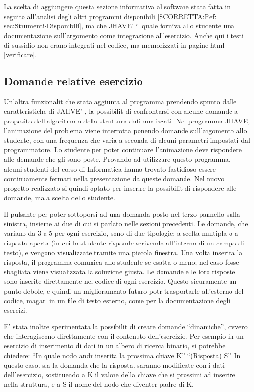 La scelta di aggiungere questa sezione informativa al software  stata
fatta in seguito all'analisi degli altri programmi disponibili \ref{SCORRETTA:Ref: sec:Strumenti-Disponibili},
ma che JHAVE' \cite{JHAVE} il quale forniva allo studente una documentazione
sull'argomento come integrazione all'esercizio. Anche qui i testi
di sussidio non erano integrati nel codice, ma memorizzati in pagine
html {[}verificare{]}.


\subsection{\label{sub:Domande-relative-esercizio}Domande relative esercizio}

Un'altra funzionalit che  stata aggiunta al programma prendendo
spunto dalle caratteristiche di JAHVE' \cite{JHAVE},  la possibilit
di confrontarsi con alcune domande a proposito dell'algoritmo o della
struttura dati analizzati. Nel programma JHAVE, l'animazione del problema
viene interrotta ponendo domande sull'argomento allo studente, con
una frequenza che varia a seconda di alcuni parametri impostati dal
programmatore. Lo studente per poter continuare l'animazione deve
rispondere alle domande che gli sono poste. Provando ad utilizzare
questo programma, alcuni studenti del corso di Informatica hanno trovato
fastidioso essere continuamente fermati nella presentazione da queste
domande. Nel nuovo progetto realizzato si  quindi optato per inserire
la possibilit di rispondere alle domande, ma a scelta dello studente.

Il pulsante per poter sottoporsi ad una domanda  posto nel terzo
pannello sulla sinistra, insieme ai due di cui si  parlato nelle
sezioni precedenti. Le domande, che variano da 3 a 5 per ogni esercizio,
sono di due tipologie: a scelta multipla o a risposta aperta (in cui
lo studente risponde scrivendo all'interno di un campo di testo),
e vengono visualizzate tramite una piccola finestra. Una volta inserita
la risposta, il programma comunica allo studente se  esatta o meno;
nel caso fosse sbagliata viene visualizzata la soluzione giusta. Le
domande e le loro risposte sono inserite direttamente nel codice di
ogni esercizio. Questo  sicuramente un punto debole, e quindi un
miglioramento futuro potr trasportarle all'esterno del codice, magari
in un file di testo esterno, come per la documentazione degli esercizi.

E' stata inoltre sperimentata la possibilit di creare domande {}``dinamiche'',
ovvero che interagiscono direttamente con il contenuto dell'esercizio.
Per esempio in un esercizio di inserimento di dati in un albero di
ricerca binario, si potrebbe chiedere: {}``In quale nodo andr inserita
la prossima chiave K'' {}``(Risposta) S''. In questo caso, sia
la domanda che la risposta, saranno modificate con i dati dell'esercizio,
sostituendo a K il valore della chiave che si  prossimi ad inserire
nella struttura, e a S il nome del nodo che diventer padre di K.


